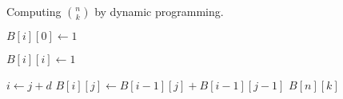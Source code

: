 
\begin{algorithm}[H]
  \caption{Computing $\binom{n}{k}$ by dynamic programming.}
  \begin{algorithmic}[1]
     
	\State $B[i][0] \gets 1$
      \EndFor

	\State $B[i][i] \gets 1$
      \EndFor

	  \State $i \gets j + d$
	  \State $B[i][j] \gets B[i-1][j] + B[i-1][j-1]$
	\EndFor
      \EndFor
      \State \Return $B[n][k]$
    \EndProcedure
  \end{algorithmic}
\end{algorithm}
